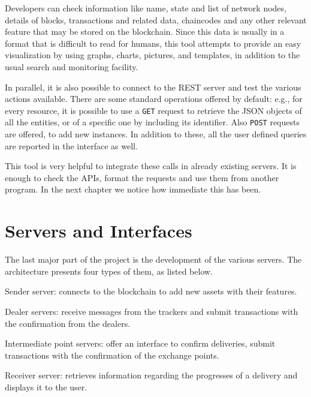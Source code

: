 Developers can check information like name, state and list of network nodes, details of blocks, transactions and related data, chaincodes and any other relevant feature that may be stored on the blockchain. Since this data is usually in a format that is difficult to read for humans, this tool attempts to provide an easy visualization by using graphs, charts, pictures, and templates, in addition to the usual search and monitoring facility.

In parallel, it is also possible to connect to the REST server and test the various actions available. There are some standard operations offered by default: e.g., for every resource, it is possible to use a \texttt{GET} request to retrieve the JSON objects of all the entities, or of a specific one by including its identifier. Also \texttt{POST} requests are offered, to add new instances. In addition to these, all the user defined queries are reported in the interface as well.

This tool is very helpful to integrate these calls in already existing servers. It is enough to check the APIs, format the requests and use them from another program. In the next chapter we notice how immediate this has been.

\newpage

\chapter{Servers and Interfaces}
\label{cha:servers}
The last major part of the project is the development of the various servers. The architecture presents four types of them, as listed below.

\begin{description}
    \item Sender server: connects to the blockchain to add new assets with their features.
    \item Dealer servers: receive messages from the trackers and submit transactions with the confirmation from the dealers.
    \item Intermediate point servers: offer an interface to confirm deliveries, submit transactions with the confirmation of the exchange points.
    \item Receiver server: retrieves information regarding the progresses of a delivery and displays it to the user.
\end{description}

